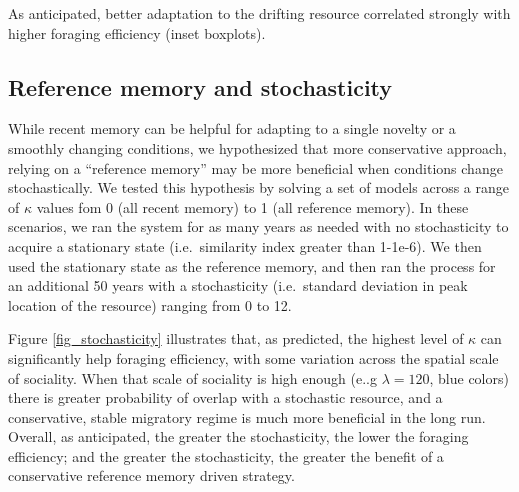 \documentclass[utf8]{frontiersSCNS} %
\begin{document}
	As anticipated, better adaptation to the drifting resource correlated strongly with higher foraging efficiency (inset boxplots).
	
	\subsection{Reference memory and stochasticity}
	
	While recent memory can be helpful for adapting to a single novelty or a smoothly changing conditions, we hypothesized that more conservative approach, relying on a ``reference memory'' may be more beneficial when conditions change stochastically. We tested this hypothesis by solving a set of models across a range of $\kappa$ values fom 0 (all recent memory) to 1 (all reference memory). In these scenarios, we ran the system for as many years as needed with no stochasticity to acquire a stationary state (i.e.~similarity index greater than 1-1e-6). We then used the stationary state as the reference memory, and then ran the process for an additional 50 years with a stochasticity (i.e.~standard deviation in peak location of the resource) ranging from 0 to 12.
	
	Figure \ref{fig_stochasticity} illustrates that, as predicted, the highest level of $\kappa$ can significantly help foraging efficiency, with some variation across the spatial scale of sociality. When that scale of sociality is high enough (e..g $\lambda = 120$, blue colors) there is greater probability of overlap with a stochastic resource, and a conservative, stable migratory regime is much more beneficial in the long run. Overall, as anticipated, the greater the stochasticity, the lower the foraging efficiency; and the greater the stochasticity, the greater the benefit of a conservative reference memory driven strategy.
	
\end{document}
